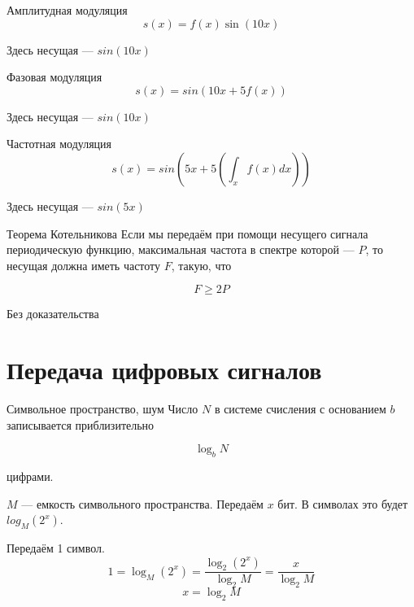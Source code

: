 \documentclass[xetex,aspectratio=43]{beamer}
\begin{document}
\begin{frame}{Амплитудная модуляция}
	\[s(x) = f(x)\sin(10 x)\]

	\begin{center}
		
	\end{center}

	Здесь несущая --- \(sin(10 x)\)
\end{frame}

\begin{frame}{Фазовая модуляция}
	\[s(x) = sin(10x+5f(x))\]

	\begin{center}
		
	\end{center}


	Здесь несущая --- \(sin(10 x)\)
\end{frame}

\begin{frame}{Частотная модуляция}
	\[s(x) = sin\left(5x+5\left(\int_x f\left( x\right) dx \right)\right)\]

	\begin{center}
		
	\end{center}

	Здесь несущая --- \(sin(5 x)\)
\end{frame}

\begin{frame}{Теорема Котельникова}
	Если мы передаём при помощи несущего сигнала периодическую функцию,
	максимальная частота в спектре которой --- \(P\), то несущая должна
	иметь частоту \(F\), такую, что

	\[F \ge 2P\]

	Без доказательства
\end{frame}

\section{Передача цифровых сигналов}

\begin{frame}{Символьное пространство, шум}
	Число \(N\) в системе счисления с основанием \(b\) записывается
	приблизительно

	\[\log_b N\]

	цифрами.

	\pause

	\(M\) --- емкость символьного пространства. Передаём \(x\) бит. В
	символах это будет \(log_M (2^x)\).

	Передаём 1 символ.
	\[1 = \log_M (2^x) = \frac{\log_2 (2^x)}{\log_2 M} = \frac{x}{\log_2 M}\]
	\[x = \log_2 M\]
\end{frame}
\end{document}
